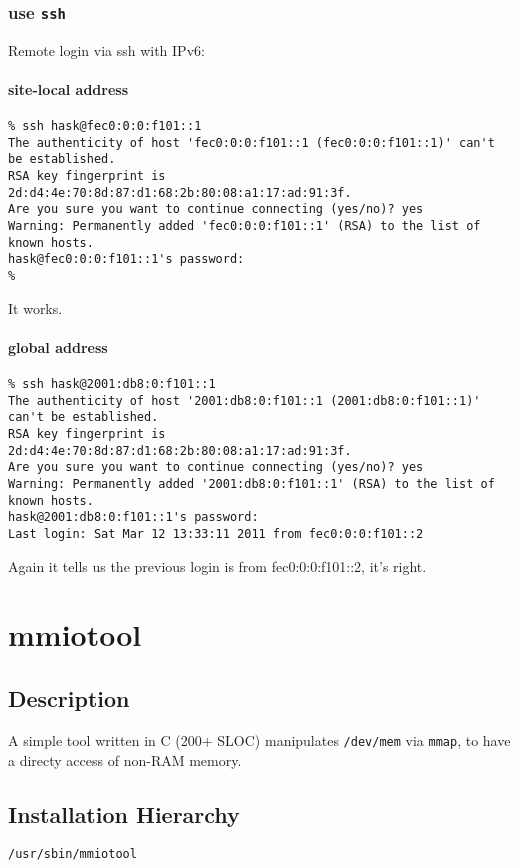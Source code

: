 \documentclass[a4paper]{report}
\begin{document}
\subsection{use {\tt ssh}}
Remote login via ssh with IPv6:
\subsubsection{site-local address}
\begin{lstlisting}
% ssh hask@fec0:0:0:f101::1
The authenticity of host 'fec0:0:0:f101::1 (fec0:0:0:f101::1)' can't be established.
RSA key fingerprint is 2d:d4:4e:70:8d:87:d1:68:2b:80:08:a1:17:ad:91:3f.
Are you sure you want to continue connecting (yes/no)? yes
Warning: Permanently added 'fec0:0:0:f101::1' (RSA) to the list of known hosts.
hask@fec0:0:0:f101::1's password: 
%
\end{lstlisting}
It works.
\subsubsection{global address}
\begin{lstlisting}
% ssh hask@2001:db8:0:f101::1
The authenticity of host '2001:db8:0:f101::1 (2001:db8:0:f101::1)' can't be established.
RSA key fingerprint is 2d:d4:4e:70:8d:87:d1:68:2b:80:08:a1:17:ad:91:3f.
Are you sure you want to continue connecting (yes/no)? yes
Warning: Permanently added '2001:db8:0:f101::1' (RSA) to the list of known hosts.
hask@2001:db8:0:f101::1's password: 
Last login: Sat Mar 12 13:33:11 2011 from fec0:0:0:f101::2
\end{lstlisting}
Again it tells us the previous login is from fec0:0:0:f101::2, it's right.


\chapter{mmiotool}
\section{Description}
A simple tool written in C (200+ SLOC) manipulates {\tt /dev/mem} via {\tt mmap}, 
to have a directy access of non-RAM memory.
\section{Installation Hierarchy}
\begin{lstlisting}
/usr/sbin/mmiotool
\end{lstlisting}
\end{document}
